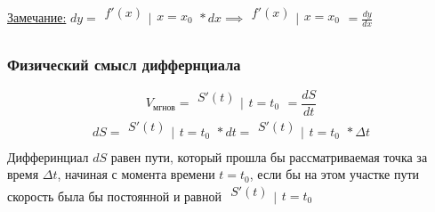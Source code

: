 \documentclass[12pt]{article}
\begin{document}
    \underline{Замечание:} $dy = \begin{matrix}f'(x)\\\\\end{matrix}\Big|\begin{matrix}\\x=x_0\\\end{matrix} * dx \implies \begin{matrix}f'(x)\\\\\end{matrix}\Big|\begin{matrix}\\x=x_0\\\end{matrix} = \frac{dy}{dx}$
    \subsubsection*{Физический смысл диффернциала}
    \[V_{\text{мгнов}}=\begin{matrix}S'(t)\\\\\end{matrix}\Big|\begin{matrix}\\t=t_0\\\end{matrix}=\frac{dS}{dt}\]
    \[ dS = \begin{matrix}S'(t)\\\\\end{matrix}\Big|\begin{matrix}\\t=t_0\\\end{matrix} * dt = \begin{matrix}S'(t)\\\\\end{matrix}\Big|\begin{matrix}\\t = t_0\\\end{matrix} * \Delta t \]
    Дифферинциал $dS$ равен пути, который прошла бы рассматриваемая точка за время $\Delta t$, начиная с момента времени $t=t_0$, если бы на этом участке пути скорость была бы постоянной и равной $\begin{matrix}S'(t)\\\\\end{matrix}\Big|\begin{matrix}\\t=t_0\\\end{matrix}$
\end{document}
